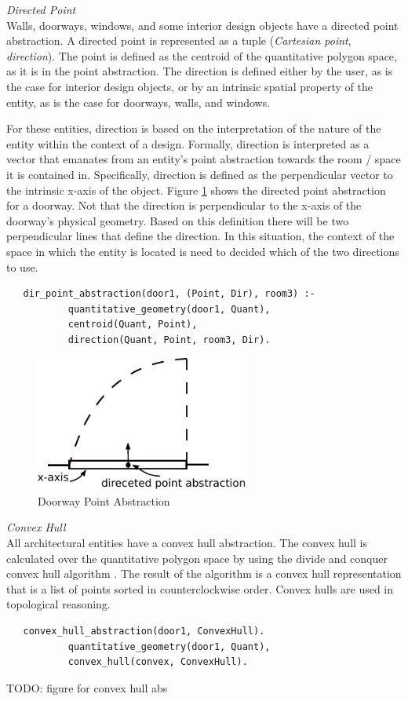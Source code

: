 \documentclass[12pt]{ucthesis}
\begin{document}
\noindent \emph{\large Directed Point} \\
\indent Walls, doorways, windows, and some interior design objects have a directed point abstraction. A directed point is represented as a tuple (\emph{Cartesian point}, \emph{direction}). The point is defined as the centroid of the quantitative polygon space, as it is in the point abstraction. The direction is defined either by the user, as is the case for interior design objects, or by an intrinsic spatial property of the entity, as is the case for doorways, walls, and windows.

For these entities, direction is based on the interpretation of the nature of the entity within the context of a design. Formally, direction is interpreted as a vector that emanates from an entity's point abstraction towards the room / space it is contained in. Specifically, direction is defined as the perpendicular vector to the intrinsic x-axis of the object. Figure \ref{dir-point-abs} shows the directed point abstraction for a doorway. Not that the direction is perpendicular to the x-axis of the doorway's physical geometry. Based on this definition there will be two perpendicular lines that define the direction. In this situation, the context of the space in which the entity is located is need to decided which of the two directions to use.  

\begin{verbatim}
   dir_point_abstraction(door1, (Point, Dir), room3) :-
           quantitative_geometry(door1, Quant),
           centroid(Quant, Point),
           direction(Quant, Point, room3, Dir).
\end{verbatim}

\begin{figure}[H]\label{dir-point-abs}
\centering
\includegraphics[width=70mm]{dir-point-abs}
\caption{Doorway Point Abstraction}
\end{figure}

\noindent \emph{\large Convex Hull} \\
\indent All architectural entities have a convex hull abstraction. The convex hull is calculated over the quantitative polygon space by using the divide and conquer convex hull algorithm \cite{tbd}. The result of the algorithm is a convex hull representation that is a list of points sorted in counterclockwise order. Convex hulls are used in topological reasoning.
\begin{verbatim}
   convex_hull_abstraction(door1, ConvexHull).
           quantitative_geometry(door1, Quant),
           convex_hull(convex, ConvexHull).
\end{verbatim}

TODO: figure for convex hull abs


\clearpage




\end{document}

